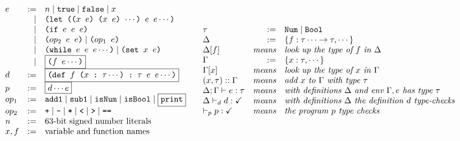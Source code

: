 \documentclass[10pt, oneside]{article}
\begin{document}
\[
\begin{array}{ll}
\begin{array}{lrl}
e & := & n \mid \texttt{true} \mid \texttt{false} \mid x \\
  & \mid  & \texttt{(let (($x\ e$) ($x\ e$) $\cdots$) $e\ e \cdots$)} \\
  & \mid  & \texttt{(if $e\ e \ e$)} \\
  & \mid  & \texttt{($op_2$ $e\ e$)} \mid \texttt{($op_1$ $e$)} \\
  & \mid  & \texttt{(while $e\ e\ e \cdots$)} \mid \texttt{(set $x\ e$)} \\
  & \mid  & \fbox{\texttt{($f\ e\cdots$)}} \\
d & := & \fbox{\texttt{(def $f$ ($x\ $:$\ \tau \cdots$) :$\ \tau$ $e\ e \cdots$)}} \\
p & := & \fbox{$d \cdots e$} \\
op_1 & := & \texttt{add1} \mid \texttt{sub1} \mid \texttt{isNum} \mid \texttt{isBool} \mid \fbox{\texttt{print}} \\
op_2 & := & \texttt{+} \mid \texttt{-} \mid \texttt{*} \mid \texttt{<} \mid \texttt{>} \mid \texttt{==} \\
n & := & \textrm{63-bit signed number literals} \\
x,f & := & \textrm{variable and function names} \\
\end{array}
&
\begin{array}{lrl}
\tau & := & \texttt{Num} \mid \texttt{Bool} \\
\Delta & := & \{f: \tau \cdots \rightarrow \tau, \cdots\} \\
\Delta[f] & \textit{means} & \textit{look up the type of } f \textit{ in } \Delta \\
\Gamma & := & \{x:\tau,\cdots\} \\
\Gamma[x] & \textit{means} & \textit{look up the type of } x \textit{ in } \Gamma \\
(x,\tau)::\Gamma & \textit{means} & \textit{add } x \textit{ to } \Gamma \textit{ with type } \tau \\
\Delta;\Gamma \vdash e : \tau & \textit{means} & \textit{with definitions } \Delta \textit{ and env } \Gamma, e \textit{ has type } \tau \\
\Delta \vdash_d d : \checkmark & \textit{means} & \textit{with definitions } \Delta \textit{ the definition } d \textit{ type-checks} \\
\vdash_p p : \checkmark & \textit{means} & \textit{the program } p \textit{ type checks } \\
\end{array}
\end{array}
\]
\end{document}
